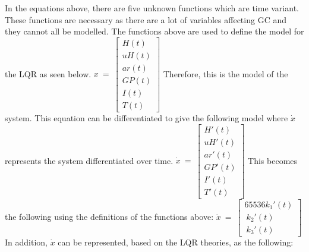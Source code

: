 \newline\newline
In the equations above, there are five unknown functions which are time variant. These functions are necessary as there are a lot of variables affecting GC and they cannot all be modelled. The functions above are used to define the model for the LQR as seen below.
\newline\newline
\begin{math}
x\ =\ \begin{bmatrix}
H( t)\\
uH( t)\\
ar( t)\\
GP( t)\\
I( t)\\
T( t)
\end{bmatrix}
\end{math}
\newline\newline
Therefore, this is the model of the system. This equation can be differentiated to give the following model where \begin{math} \dot{x} \end{math} represents the system differentiated over time. 
\newline\newline
\begin{math}
\dot{x} \ =\ \begin{bmatrix}
H'( t)\\
uH'( t)\\
ar'( t)\\
GP'( t)\\
I'( t)\\
T'( t)
\end{bmatrix}
\end{math}
\newline\newline
This becomes the following using the definitions of the functions above:
\newline\newline
\begin{math}
\dot{x} \ =\ \begin{bmatrix}
65536k_{1} '( t)\\
\ k_{2} '( t)\\
\ k_{3} '( t)
\end{bmatrix}
\end{math}
\newline\newline
In addition, \begin{math} \dot{x} \end{math} can be represented, based on the LQR theories, as the following:
